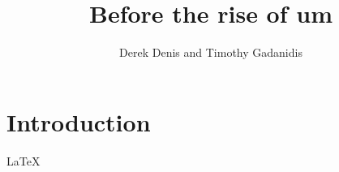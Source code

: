 \documentclass{article}
\title{Before the rise of um}
\author{Derek Denis and Timothy Gadanidis}
\begin{document}
\maketitle

\section{Introduction}

\LaTeX{}
\end{document}
